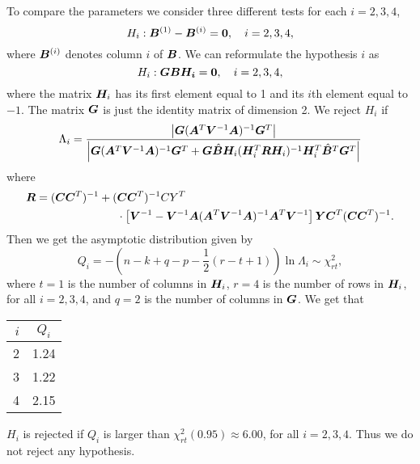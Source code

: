 To compare the parameters we consider three different tests for each $i = 2,3,4$,
\begin{equation*}
  H_i: \bm{B}^{(1)} - \bm{B}^{(i)} = \bm{0},\quad i = 2,3,4,
\end{equation*}
where $\bm{B}^{(i)}$ denotes column $i$ of $\bm{B}$. We can reformulate the
hypothesis $i$ as
\begin{equation*}
  H_i: \bm{G B H_i} = \bm{0}, \quad i = 2,3,4,
\end{equation*}
where the matrix $\bm{H}_i$ has its first element equal to 1 and its $i$th element
equal to $-1$. The matrix $\bm{G}$ is just the identity matrix of
dimension 2. We reject $H_{i}$ if 
\begin{equation*}
  \Lambda_{i} = \frac{\left| \bm{G} (\bm{A}^{T} \bm{V}^{-1} \bm{A})^{-1}\bm{G}^{T} \right|}
  {\left| \bm{G} (\bm{A}^{T} \bm{V}^{-1} \bm{A})^{-1} \bm{G} ^{T} + \bm{G} \hat{\bm{B}}\bm{H}_{i}(\bm{H}_{i}^{T} \bm{R} \bm{H}_{i})^{-1}\bm{H}_{i}^{T} \hat{\bm{B}}^{T} \bm{G}^{T} \right|}
\end{equation*}
where
\begin{align*}
  \bm{R} = (\bm{C} \bm{C}^{T})^{-1} + ( &\bm{C} \bm{C}^{T})^{-1} CY^{T} \\
 &  \cdot\left[
    \bm{V}^{-1}  - \bm{V}^{-1}\bm{A}(\bm{A}^{T} \bm{V}^{-1} \bm{A})^{-1}\bm{A}^{T} \bm{V}^{-1}
  \right] 
  \bm{Y} \bm{C}^{T}(\bm{C} \bm{C}^{T})^{-1}.
\end{align*}
Then we get the  asymptotic distribution given by
\begin{equation*}
 Q_{i} = - \left(n - k + q - p - \frac{1}{2}(r - t + 1)\right) \ln \Lambda_{i} \sim \chi^{2}_{rt}, 
\end{equation*}
where $t=1$ is the number of columns in $\bm{H}_{i}$, $r = 4$ is the
number of rows in $\bm{H}_{i}$, for all $i = 2,3,
4$, and $q = 2$ is the number of columns in $\bm{G}$. We get that
\begin{center}
  \begin{tabular}{r|c}
    $i$   & $Q_{i}$   \\ \hline
    2   & 1.24 \\
    3   & 1.22 \\
    4   & 2.15 \\
  \end{tabular}
\end{center}
$H_{i}$ is rejected  if $Q_{i}$ is larger than
$\chi^{2}_{rt}(0.95) \approx 6.00$, for all $i = 2,3,4$. Thus we do not reject any hypothesis. 
